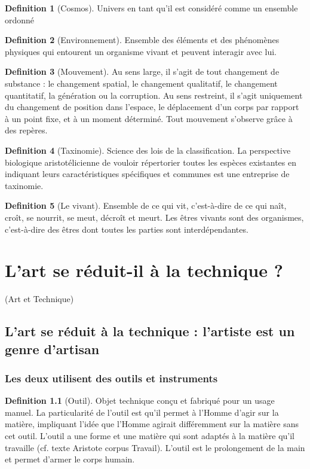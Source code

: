 \documentclass[french]{book}
\theoremstyle{definition}
\newtheorem*{dfn}{Definition}
\begin{document}
\begin{dfn}[Cosmos]
Univers en tant qu’il est considéré comme un ensemble ordonné
\end{dfn}

\begin{dfn}[Environnement] 
Ensemble des éléments et des phénomènes physiques qui entourent un organisme vivant et peuvent interagir avec lui.
\end{dfn}

\begin{dfn}[Mouvement]
Au sens large, il s’agit de tout changement de substance : le changement spatial, le changement qualitatif, le changement quantitatif, la génération ou la corruption. Au sens restreint, il s’agit uniquement du changement de position dans l’espace, le déplacement d’un corps par rapport à un point fixe, et à un moment déterminé. Tout mouvement s’observe grâce à des repères.
\end{dfn}

\begin{dfn}[Taxinomie]
Science des lois de la classification. La perspective biologique aristotélicienne de vouloir répertorier toutes les espèces existantes en indiquant leurs caractéristiques spécifiques et communes est une entreprise de taxinomie.
\end{dfn}

\begin{dfn}[Le vivant]
Ensemble de ce qui vit, c’est-à-dire de ce qui naît, croît, se nourrit, se meut, décroît et meurt. Les êtres vivants sont des organismes, c’est-à-dire des êtres dont toutes les parties sont interdépendantes.
\end{dfn}

\chapter{L’art se réduit-il à la technique ?}
(Art et Technique)
\section{L’art se réduit à la technique : l’artiste est un genre d’artisan}

\subsection{Les deux utilisent des outils et instruments}


\begin{dfn}[Outil]
	Objet technique conçu et fabriqué pour un usage manuel. La particularité de l'outil est qu’il permet à l’Homme d’agir sur la matière, impliquant l’idée que l’Homme agirait différemment sur la matière sans cet outil. L’outil a une forme et une matière qui sont adaptés à la matière qu’il travaille (cf. texte Aristote corpus Travail). L’outil est le prolongement de la main et permet d’armer le corps humain.
\end{dfn}
\end{document}

